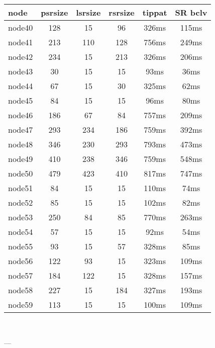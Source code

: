 \begin{tabular}{|l|c|c|c|c|c|}
\hline node & psrsize & lsrsize & rsrsize   & tippat & SR bclv\\
    \hline node40 & 128 & 15 & 96 & 326ms & 115ms\\
    \hline node41 & 213 & 110 & 128 & 756ms & 249ms\\
    \hline node42 & 234 & 15 & 213 & 326ms & 206ms\\
    \hline node43 & 30 & 15 & 15 & 93ms & 36ms\\
    \hline node44 & 67 & 15 & 30 & 325ms & 62ms\\
    \hline node45 & 84 & 15 & 15 & 96ms & 80ms\\
    \hline node46 & 186 & 67 & 84 & 757ms & 209ms\\
    \hline node47 & 293 & 234 & 186 & 759ms & 392ms\\
    \hline node48 & 346 & 230 & 293 & 793ms & 473ms\\
    \hline node49 & 410 & 238 & 346 & 759ms & 548ms\\
    \hline node50 & 479 & 423 & 410 & 817ms & 747ms\\
    \hline node51 & 84 & 15 & 15 & 110ms & 74ms\\
    \hline node52 & 85 & 15 & 15 & 102ms & 82ms\\
    \hline node53 & 250 & 84 & 85 & 770ms & 263ms\\
    \hline node54 & 57 & 15 & 15 & 92ms & 54ms\\
    \hline node55 & 93 & 15 & 57 & 328ms & 85ms\\
    \hline node56 & 122 & 93 & 15 & 323ms & 109ms\\
    \hline node57 & 184 & 122 & 15 & 328ms & 157ms\\
    \hline node58 & 227 & 15 & 184 & 327ms & 193ms\\
    \hline node59 & 113 & 15 & 15 & 100ms & 109ms\\

\hline
\end{tabular} \

---


